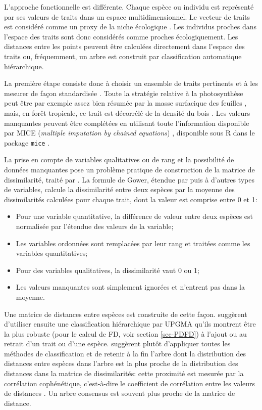 \documentclass[
  11pt,
  french,
  a4paper,
  extrafontsizes,onecolumn,openright
  ]{memoir}
\providecommand{\tightlist}{%
  \setlength{\itemsep}{0pt}\setlength{\parskip}{0pt}}
\newlength{\rf}
\begin{document}
L'approche fonctionnelle est différente.
Chaque espèce ou individu est représenté par ses valeurs de traits dans un espace multidimensionnel.
Le vecteur de traits est considéré comme un proxy de la niche écologique \autocite{Westoby2002}.
Les individus proches dans l'espace des traits sont donc considérés comme proches écologiquement.
Les distances entre les points peuvent être calculées directement dans l'espace des traits ou, fréquemment, un arbre est construit par classification automatique hiérarchique.

La première étape consiste donc à choisir un ensemble de traits pertinents et à les mesurer de façon standardisée \autocite{Cornelissen2003}.
Toute la stratégie relative à la photosynthèse peut être par exemple assez bien résumée par la masse surfacique des feuilles \autocite{Wright2004}, mais, en forêt tropicale, ce trait est décorrélé de la densité du bois \autocite{Baraloto2010}.
Les valeurs manquantes peuvent être complétées en utilisant toute l'information disponible par MICE (\emph{multiple imputation by chained equations}) \autocite{VanBuuren2006}, disponible sous R dans le package \texttt{mice} \autocite{VanBuuren2011}.

La prise en compte de variables qualitatives ou de rang et la possibilité de données manquantes pose un problème pratique de construction de la matrice de dissimilarité, traité par \textcite{Gower1971}.
La formule de Gower, étendue par \textcite{Podani1999} puis \textcite{Pavoine2009b} à d'autres types de variables, calcule la dissimilarité entre deux espèces par la moyenne des dissimilarités calculées pour chaque trait, dont la valeur est comprise entre 0 et 1:

\begin{itemize}
\tightlist
\item
  Pour une variable quantitative, la différence de valeur entre deux espèces est normalisée par l'étendue des valeurs de la variable;
\item
  Les variables ordonnées sont remplacées par leur rang et traitées comme les variables quantitatives;
\item
  Pour des variables qualitatives, la dissimilarité vaut 0 ou 1;
\item
  Les valeurs manquantes sont simplement ignorées et n'entrent pas dans la moyenne.
\end{itemize}

Une matrice de distances entre espèces est construite de cette façon.
\textcite{Podani2006} suggèrent d'utiliser ensuite une classification hiérarchique par UPGMA \autocite{Sokal1958} qu'ils montrent être la plus robuste (pour le calcul de FD, voir section \ref{sec-PDFD}) à l'ajout ou au retrait d'un trait ou d'une espèce.
\textcite{Mouchet2008} suggèrent plutôt d'appliquer toutes les méthodes de classification et de retenir à la fin l'arbre dont la distribution des distances entre espèces dans l'arbre est la plus proche de la distribution des distances dans la matrice de dissimilarités: cette proximité est mesurée par la corrélation cophénétique, c'est-à-dire le coefficient de corrélation entre les valeurs de distances \autocite{Sokal1962,Legendre2012}.
Un arbre consensus \autocite{Felsenstein2004} est souvent plus proche de la matrice de distance.
\end{document}
